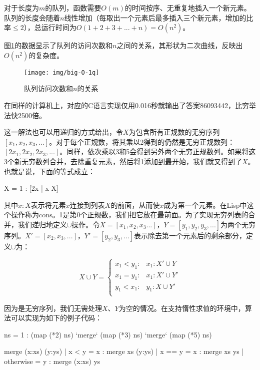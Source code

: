 \documentclass[b5paper]{ctexart}
\begin{document}
对于长度为$m$的队列，函数需要$O(m)$的时间按序、无重复地插入一个新元素。队列的长度会随着$n$线性增加（每取出一个元素后最多插入三个新元素，增加的比率$\leq 2$），总运行时间为$O(1 + 2 + 3 + ... + n) = O(n^2)$。

图\ref{fig:big-O-1q}的数据显示了队列的访问次数和$n$之间的关系，其形状为二次曲线，反映出$O(n^2)$的复杂度。

\begin{figure}[htbp]
  \centering
  \texttt{[image: img/big-O-1q]}
  \caption{队列访问次数和$n$的关系} \label{fig:big-O-1q}
\end{figure}

在同样的计算机上，对应的C语言实现仅用0.016秒就输出了答案86093442，比穷举法快2500倍。

这一解法也可以用递归的方式给出，令$X$为包含所有正规数的无穷序列$[x_1, x_2, x_3, ...]$。对于每个正规数，将其乘以2得到的仍然是无穷正规数列：$[2x_1, 2x_2, 2x_3, ...]$。同样，依次乘以3和5会得到另外两个无穷正规数列。如果将这3个新无穷数列合并，去除重复元素，然后将1添加到最开始，我们就又得到了$X$。也就是说，下面的等式成立：

\be
  X = 1 : [2x | \forall x \in X]\cup [3x | \forall x \in X] \cup [5x | \forall x \in X]
\ee

其中$x : X$表示将元素$x$连接到列表$X$的前面，从而使$x$成为第一个元素。在Lisp中这个操作称为cons。1是第0个正规数，我们把它放在最前面。为了实现无穷列表的合并，我们递归地定义$\cup$操作。令$X=[x_1, x_2, x_3...]$，$Y=[y_1, y_2, y_3, ...]$为两个无穷序列。$X' = [x_2, x_3, ...]$，$Y'=[y_2, y_3, ...]$表示除去第一个元素后的剩余部分，定义$\cup$为：

\[
X \cup Y = \begin{cases}
  x_1 < y_1: & x_1 : X' \cup Y \\
  x_1 = y_1: & x_1 : X' \cup Y' \\
  y_1 < x_1: & y_1 : X \cup Y' \\
\end{cases}
\]

因为是无穷序列，我们无需处理$X$、$Y$为空的情况。在支持惰性求值的环境中，算法可以实现为如下的例子代码：

\begin{Haskell}
ns = 1 : (map (*2) ns) `merge` (map (*3) ns) `merge` (map (*5) ns)

merge (x:xs) (y:ys) | x < y = x : merge xs (y:ys)
                    | x == y = x : merge xs ys
                    | otherwise = y : merge (x:xs) ys
\end{Haskell}
\end{document}

